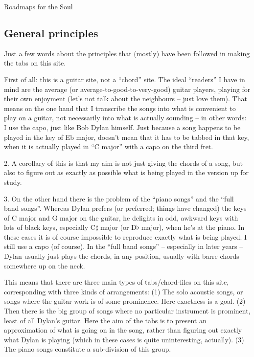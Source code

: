 
\thispagestyle{empty}
\label{roadmaps}

\vspace*{20ex}

\begin{flushright}{\Huge Roadmaps for the Soul}\end{flushright}

\vspace{5ex}

\subsection*{General principles}

Just a few words about the principles that (mostly) have been followed
in making the tabs on this site.

First of all: this is a guitar site, not a ``{}chord''{} site. The
ideal ``{}readers''{} I have in mind are the average (or
average-to-good-to-very-good) guitar players, playing for their own
enjoyment (let's not talk about the neighbours -- just love
them). That means on the one hand that I transcribe the songs into
what is convenient to play on a guitar, not necessarily into what is
actually sounding -- in other words: I use the capo, just like Bob Dylan
himself. Just because a song happens to be played in the key of Eb
major, doesn't mean that it has to be tabbed in that key, when it is
actually played in ``{}C major''{} with a capo on the third fret.

2. A corollary of this is that my aim is not just giving the chords of
a song, but also to figure out as exactly as possible what is being
played in the version up for study.

3. On the other hand there is the problem of the ``{}piano songs''{}
and the ``{}full band songs''{}. Whereas Dylan prefers (or preferred;
things have changed) the keys of C major and G major on the guitar, he
delights in odd, awkward keys with lots of black keys, especially
C$\sharp$ major (or D$\flat$ major), when he's at the piano. In these
cases it is of course impossible to reproduce exactly what is being
played. I still use a capo (of course). In the ``{}full band songs''{}
-- especially in later years -- Dylan usually just plays the chords,
in any position, usually with barre chords somewhere up on the neck.

This means that there are three main types of tabs/chord-files on this
site, corresponding with three kinds of arrangements: (1) The solo
acoustic songs, or songs where the guitar work is of some
prominence. Here exactness is a goal. (2) Then there is the big group
of songs where no particular instrument is prominent, least of all
Dylan's guitar. Here the aim of the tabs is to present an
approximation of what is going on in the song, rather than figuring
out exactly what Dylan is playing (which in these cases is quite
uninteresting, actually). (3) The piano songs constitute a
sub-division of this group.

